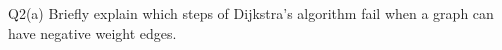 \begin{problem}
  {Q2(a)}
  Briefly explain which steps of Dijkstra's algorithm fail when a graph can have negative weight edges. \\
\end{problem}
